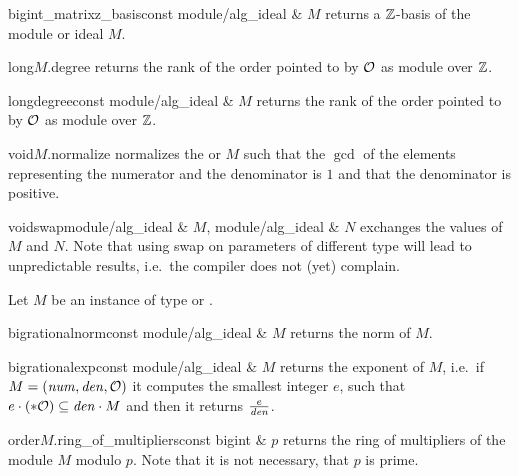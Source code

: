 \begin{cfcode}{bigint_matrix}{z_basis}{const module/alg_ideal & $M$}
  returns a $\mathbb{Z}$-basis of the module or ideal $M$.
\end{cfcode}

\begin{cfcode}{long}{$M$.degree}{}
  returns the rank of the order pointed to by $\mathcal{O}$ as module over $\mathbb{Z}$.
\end{cfcode}

\begin{fcode}{long}{degree}{const module/alg_ideal & $M$}
  returns the rank of the order pointed to by $\mathcal{O}$ as module over $\mathbb{Z}$.
\end{fcode}

\begin{fcode}{void}{$M$.normalize}{}
  normalizes the  or  $M$ such that the $\gcd$ of the elements
  representing the numerator and the denominator is $1$ and that the denominator is positive.
\end{fcode}

\begin{fcode}{void}{swap}{module/alg_ideal & $M$, module/alg_ideal & $N$}
  exchanges the values of $M$ and $N$.  Note that using swap on parameters of different type
  will lead to unpredictable results, i.e.~the compiler does not (yet) complain.
\end{fcode}



\HIGH

Let $M$ be an instance of type  or .

\begin{fcode}{bigrational}{norm}{const module/alg_ideal & $M$}
  returns the norm of $M$.
\end{fcode}

\begin{fcode}{bigrational}{exp}{const module/alg_ideal & $M$}
  returns the exponent of $M$, i.e.~if $M = (\mathit{num}, \mathit{den}, \mathcal{O})$ it computes the smallest integer
  $e$, such that $e\cdot (*\mathcal{O}) \subseteq \mathit{den} \cdot M$ and then it returns $\frac{e}{\mathit{den}}$.
\end{fcode}

\begin{cfcode}{order}{$M$.ring_of_multipliers}{const bigint & $p$}
  returns the ring of multipliers of the module $M$ modulo $p$.  Note that it is not necessary,
  that $p$ is prime.
\end{cfcode}


